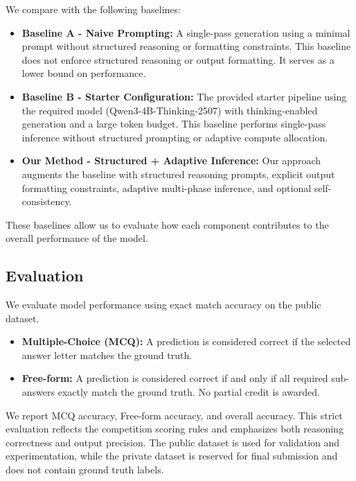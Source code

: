 \documentclass{article}
\begin{document}
We compare with the following baselines:
\begin{itemize}
    \item \textbf{Baseline A - Naive Prompting:} A single-pass generation using a minimal prompt without structured reasoning or formatting constraints. This baseline does not enforce structured reasoning or output formatting. It serves as a lower bound on performance.
    \item \textbf{Baseline B - Starter Configuration:} The provided starter pipeline using the required model (Qwen3-4B-Thinking-2507) with thinking-enabled generation and a large token budget. This baseline performs single-pass inference without structured prompting or adaptive compute allocation.
    \item \textbf{Our Method - Structured + Adaptive Inference:} Our approach augments the baseline with structured reasoning prompts, explicit output formatting constraints, adaptive multi-phase inference, and optional self-consistency.
\end{itemize}

These baselines allow us to evaluate how each component contributes to the overall performance of the model.
% 
\subsection{Evaluation}
\label{sec:evaluation}

We evaluate model performance using exact match accuracy on the public dataset.
\begin{itemize}
    \item \textbf{Multiple-Choice (MCQ):} A prediction is considered correct if the selected answer letter matches the ground truth.
    \item \textbf{Free-form:} A prediction is considered correct if and only if all required sub-answers exactly match the ground truth. No partial credit is awarded.
\end{itemize}

We report MCQ accuracy, Free-form accuracy, and overall accuracy. This strict evaluation reflects the competition scoring rules and emphasizes both reasoning correctness and output precision. The public dataset is used for validation and experimentation, while the private dataset is reserved for final submission and does not contain ground truth labels.
\end{document}
